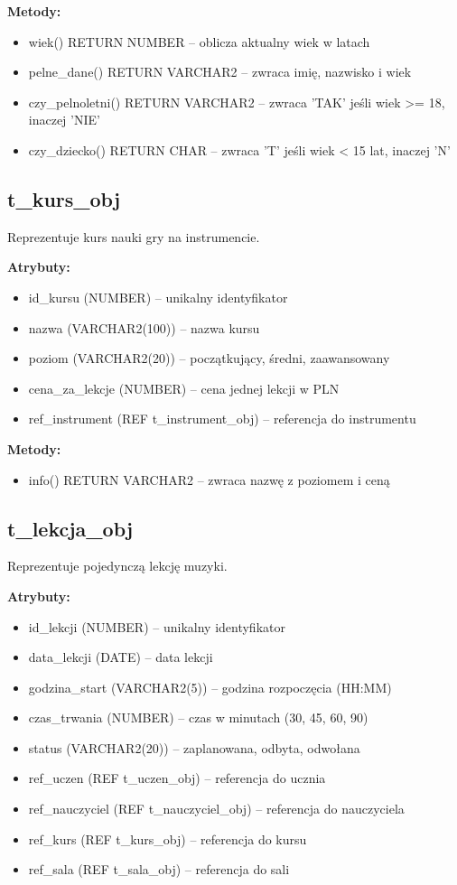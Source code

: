 \documentclass[12pt,a4paper]{article}
\begin{document}
\textbf{Metody:}
\begin{itemize}[nosep]
    \item wiek() RETURN NUMBER -- oblicza aktualny wiek w latach
    \item pelne\_dane() RETURN VARCHAR2 -- zwraca imię, nazwisko i wiek
    \item czy\_pelnoletni() RETURN VARCHAR2 -- zwraca 'TAK' jeśli wiek >= 18, inaczej 'NIE'
    \item czy\_dziecko() RETURN CHAR -- zwraca 'T' jeśli wiek < 15 lat, inaczej 'N'
\end{itemize}

\subsection{t\_kurs\_obj}

Reprezentuje kurs nauki gry na instrumencie.

\textbf{Atrybuty:}
\begin{itemize}[nosep]
    \item id\_kursu (NUMBER) -- unikalny identyfikator
    \item nazwa (VARCHAR2(100)) -- nazwa kursu
    \item poziom (VARCHAR2(20)) -- początkujący, średni, zaawansowany
    \item cena\_za\_lekcje (NUMBER) -- cena jednej lekcji w PLN
    \item ref\_instrument (REF t\_instrument\_obj) -- referencja do instrumentu
\end{itemize}

\textbf{Metody:}
\begin{itemize}[nosep]
    \item info() RETURN VARCHAR2 -- zwraca nazwę z poziomem i ceną
\end{itemize}

\subsection{t\_lekcja\_obj}

Reprezentuje pojedynczą lekcję muzyki.

\textbf{Atrybuty:}
\begin{itemize}[nosep]
    \item id\_lekcji (NUMBER) -- unikalny identyfikator
    \item data\_lekcji (DATE) -- data lekcji
    \item godzina\_start (VARCHAR2(5)) -- godzina rozpoczęcia (HH:MM)
    \item czas\_trwania (NUMBER) -- czas w minutach (30, 45, 60, 90)
    \item status (VARCHAR2(20)) -- zaplanowana, odbyta, odwołana
    \item ref\_uczen (REF t\_uczen\_obj) -- referencja do ucznia
    \item ref\_nauczyciel (REF t\_nauczyciel\_obj) -- referencja do nauczyciela
    \item ref\_kurs (REF t\_kurs\_obj) -- referencja do kursu
    \item ref\_sala (REF t\_sala\_obj) -- referencja do sali
\end{itemize}
\end{document}
